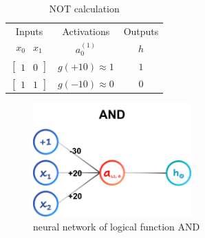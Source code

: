\begin{itemize}
    \begin{table}[H]
        \renewcommand\arraystretch{1.5}
        \caption{NOT calculation}
        \centering
        \begin{tabular}{ccc}
            \hline\hline %
            Inputs                                                 & Activations        & Outputs    \\ 
            $\begin{array}{ccc} x_0 & x_1 \end{array}$             & $a^{(1)}_0$        & $h$        \\ 
            \hline %
            $\left[{\begin{array}{ccc} 1 & 0 \end{array}}\right]$  & $g(+10) \approx 1$ & $1$        \\
            $\left[{\begin{array}{ccc} 1 & 1 \end{array}}\right]$  & $g(-10) \approx 0$ & $0$        \\[1ex]
            \hline\hline %
        \end{tabular}
    \end{table}
    
    \begin{figure}[H]
        \centering
        \includegraphics[width=2.4in]{./images/logicGate_AND.png}
        \caption{neural network of logical function AND}
    \end{figure}


\end{itemize}
